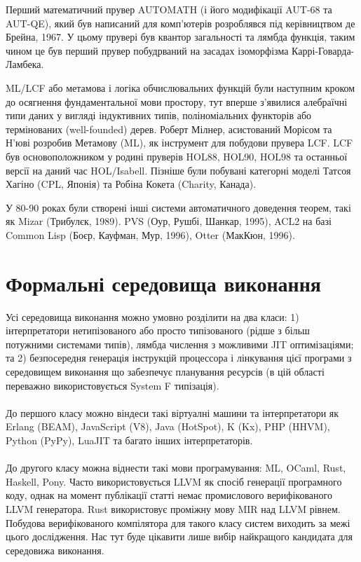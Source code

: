 Перший математичний прувер AUTOMATH (і його модифікації AUT-68 та AUT-QE),
який був написаний для комп'ютерів розроблявся під керівництвом де Брейна, 1967.
У цьому прувері був квантор загальності та лямбда функція, таким чином це був перший прувер
побудрваний на засадах ізоморфізма Каррі-Говарда-Ламбека.

ML/LCF або метамова і логіка обчислювальних функцій були наступним кроком до
осягнення фундаментальної мови простору, тут вперше з'явилися алебраїчні типи даних
у вигляді індуктивних типів, поліноміальних функторів або термінованих (well-founded) дерев.
Роберт Мілнер, асистований Морісом та Н'юві розробив Метамову (ML), як
інструмент для побудови прувера LCF. LCF був основоположником у родині пруверів
HOL88, HOL90, HOL98 та останньої версії на даний час HOL/Isabell.
Пізніше були побувані категорні моделі Татсоя Хагіно (CPL, Японія)
та Робіна Кокета (Charity, Канада).

У 80-90 роках були створені інші системи автоматичного доведення теорем,
такі як Mizar (Трибулєк, 1989). PVS (Оур, Рушбі, Шанкар, 1995),
ACL2 на базі Common Lisp (Боєр, Кауфман, Мур, 1996), Otter (МакКюн, 1996).


\section{Формальні середовища виконання}

Усі середовища виконання можно умовно розділити на два класи:
1) інтерпретатори нетипізованого або просто
типізованого (рідше з більш потужними системами типів),
лямбда числення з можливими JIT оптимізаціями; та 2)
безпосередня генерація інструкцій процессора і лінкування цієї програми з
середовищем виконання що забезпечує планування ресурсів
(в цій області переважно використовується System F типізація).

\paragraph{}
До першого класу можно віндеси такі віртуалні машини та інтерпретатори як
Erlang (BEAM), JavaScript (V8), Java (HotSpot), K (Kx), PHP (HHVM), Python (PyPy), LuaJIT
та багато інших інтерпретаторів.

\paragraph{}
До другого класу можна віднести такі мови програмування: ML, OCaml, Rust,
Haskell, Pony. Часто використовується LLVM як спосіб генерації програмного коду,
однак на момент публікації статті немає промислового верифікованого LLVM генератора.
Rust використовує проміжну мову MIR над LLVM рівнем. Побудова верифікованого компілятора
для такого класу систем виходить за межі цього дослідження. Нас тут буде цікавити
лише вибір найкращого кандидата для середовижа виконання.

